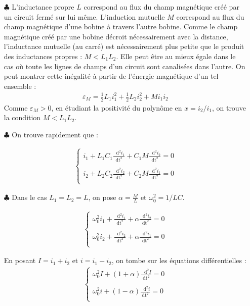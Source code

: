 \documentclass{report}
\newcommand*\dif{\mathop{}\!\mathrm{d}}
\begin{document}
\begin{itemize}

	\item[$\clubsuit$] L'inductance propre $L$ correspond au flux du champ magnétique créé par un circuit fermé sur lui même. L'induction mutuelle $M$ correspond au flux du champ magnétique d'une bobine à travers l'autre bobine. Comme le champ magnétique créé par une bobine décroit nécessairement avec la distance, l'inductance mutuelle (au carré) est nécessairement plus petite que le produit des inductances propres : $M<L_1L_2$. Elle peut être au mieux égale dans le cas où toute les lignes de champs d'un circuit sont canalisées dans l'autre. On peut montrer cette inégalité à partir de l'énergie magnétique d'un tel ensemble : 
	\begin{align*}
		\varepsilon_M=\frac{1}{2}L_1i_1^2+\frac{1}{2}L_2i_2^2+Mi_1i_2
	\end{align*}
	Comme $\varepsilon_M>0$, en étudiant la positivité du polynôme en $x=i_2/i_1$, on trouve la condition $M<L_1L_2$.
	
	\item[$\clubsuit$] On trouve rapidement que :
	
	\begin{align*}
	\left\lbrace
	\begin{array}{ccc}
	i_1 + L_1C_1\frac{\dif^2 i_1}{\mathrm{dt}^2}+C_1M\frac{\dif^2 i_2}{\mathrm{dt}^2}=0\\
	\\
	i_2 + L_2C_2\frac{\dif^2 i_2}{\mathrm{dt}^2}+C_2M\frac{\dif^2 i_1}{\mathrm{dt}^2}=0\\
	\end{array}\right.
	\end{align*}		
	
	\item[$\clubsuit$] Dans le cas $L_1=L_2=L$, on pose $\alpha=\frac{M}{L}$ et $\omega_0^2=1/LC$.
	
	\begin{align*}
	\left\lbrace
	\begin{array}{ccc}
	\omega_0^2i_1+\frac{\dif^2 i_1}{\mathrm{dt}^2}+\alpha\frac{\dif^2 i_2}{\mathrm{dt}^2}=0\\
	\\
	\omega_0^2i_2+\frac{\dif^2 i_2}{\mathrm{dt}^2}+\alpha\frac{\dif^2 i_1}{\mathrm{dt}^2}=0\\
	\end{array}\right.
	\end{align*}		
	
	En posant $I=i_1+i_2$ et $i=i_1-i_2$, on tombe sur les équations différentielles :
	\begin{align*}
	\left\lbrace
	\begin{array}{ccc}
	\omega_0^2I+(1+\alpha)\frac{\dif^2 I}{\mathrm{dt}^2}=0\\
	\\
	\omega_0^2i+(1-\alpha)\frac{\dif^2 i}{\mathrm{dt}^2}=0\\
	\end{array}\right.
	\end{align*}		
	

\end{itemize}
\end{document}
